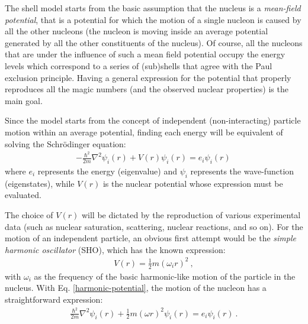The shell model starts from the basic assumption that the nucleus is a \emph{mean-field potential}, that is a potential for which the motion of a single nucleon is caused by all the other nucleons (the nucleon is moving inside an average potential generated by all the other constituents of the nucleus). Of course, all the nucleons that are under the influence of such a mean field potential occupy the energy levels which correspond to a series of (sub)shells that agree with the Paul exclusion principle. Having a general expression for the potential that properly reproduces all the magic numbers (and the observed nuclear properties) is the main goal.

Since the model starts from the concept of independent (non-interacting) particle motion within an average potential, finding each energy will be equivalent of solving the Schrödinger equation:
\begin{align}
    -\frac{\hbar^2}{2m}\nabla ^2\psi_i(r)+V(r)\psi_i(r)=e_i\psi_i(r)\, 
    \label{schrodinger-single-particle-eq}
\end{align}
where $e_i$ represents the energy (eigenvalue) and $\psi_i$ represents the wave-function (eigenstates), while $V(r)$ is the nuclear potential whose expression must be evaluated.

The choice of $V(r)$ will be dictated by the reproduction of various experimental data (such as nuclear saturation, scattering, nuclear reactions, and so on). For the motion of an independent particle, an obvious first attempt would be the \emph{simple harmonic oscillator} (SHO), which has the known expression:
\begin{align}
    V(r)=\frac{1}{2}m(\omega_i r)^2\ ,
    \label{harmonic-potential}
\end{align}
with $\omega_i$ as the frequency of the basic harmonic-like motion of the particle in the nucleus. With Eq. \ref{harmonic-potential}, the motion of the nucleon has a straightforward expression:
\begin{align}
    \frac{\hbar^2}{2m}\nabla^2\psi_i(r)+\frac{1}{2}m(\omega r)^2\psi_i(r)=e_i\psi_i(r)\ .
\end{align}


